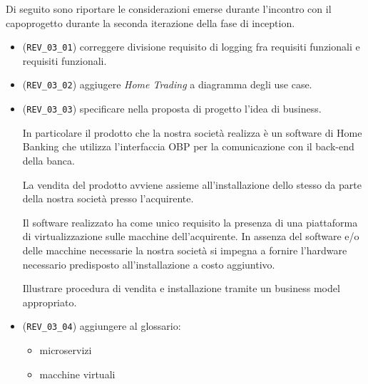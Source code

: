 \documentclass[a4paper,11pt]{texmemo}
\newcommand{\code}[1]{\texttt{#1}}
\begin{document}
\maketitle

Di seguito sono riportare le considerazioni emerse durante l'incontro con il capoprogetto durante la seconda iterazione della fase di inception.

\begin{itemize}
	\item (\code{REV\_03\_01}) correggere divisione requisito di logging fra requisiti funzionali e requisiti funzionali.
	\item (\code{REV\_03\_02}) aggiugere \emph{Home Trading} a diagramma degli use case.
	\item (\code{REV\_03\_03}) specificare nella proposta di progetto l'idea di business.

		In particolare il prodotto che la nostra societ\`a realizza \`e un software di Home Banking che utilizza l'interfaccia OBP per la comunicazione con il back-end della banca.

		La vendita del prodotto avviene assieme all'installazione dello stesso da parte della nostra societ\`a presso l'acquirente.

		Il software realizzato ha come unico requisito la presenza di una piattaforma di virtualizzazione sulle macchine dell'acquirente.
		In assenza del software e/o delle macchine necessarie la nostra societ\`a si impegna a fornire l'hardware necessario predisposto all'installazione a costo aggiuntivo.

		Illustrare procedura di vendita e installazione tramite un business model appropriato.
	\item (\code{REV\_03\_04}) aggiungere al glossario:
		\begin{itemize}
			\item microservizi
			\item macchine virtuali
		\end{itemize}
\end{itemize}
\end{document}
